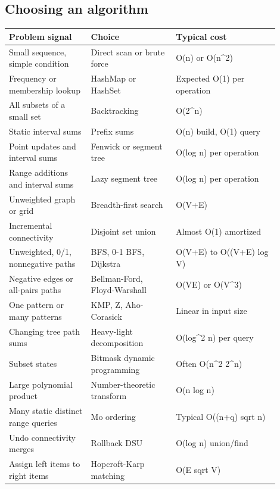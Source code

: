 \documentclass[10pt,letterpaper]{article}
\begin{document}
\subsection*{Choosing an algorithm}
\small\begin{longtable}{>{\raggedright\arraybackslash}p{0.27\linewidth}>{\raggedright\arraybackslash}p{0.29\linewidth}>{\raggedright\arraybackslash}p{0.34\linewidth}}\toprule
\textbf{Problem signal} & \textbf{Choice} & \textbf{Typical cost}\\\midrule\endhead
Small sequence, simple condition & Direct scan or brute force & O(n) or O(n\textasciicircum{}2)\\
Frequency or membership lookup & HashMap or HashSet & Expected O(1) per operation\\
All subsets of a small set & Backtracking & O(2\textasciicircum{}n)\\
Static interval sums & Prefix sums & O(n) build, O(1) query\\
Point updates and interval sums & Fenwick or segment tree & O(log n) per operation\\
Range additions and interval sums & Lazy segment tree & O(log n) per operation\\
Unweighted graph or grid & Breadth-first search & O(V+E)\\
Incremental connectivity & Disjoint set union & Almost O(1) amortized\\
Unweighted, 0/1, nonnegative paths & BFS, 0-1 BFS, Dijkstra & O(V+E) to O((V+E) log V)\\
Negative edges or all-pairs paths & Bellman-Ford, Floyd-Warshall & O(VE) or O(V\textasciicircum{}3)\\
One pattern or many patterns & KMP, Z, Aho-Corasick & Linear in input size\\
Changing tree path sums & Heavy-light decomposition & O(log\textasciicircum{}2 n) per query\\
Subset states & Bitmask dynamic programming & Often O(n\textasciicircum{}2 2\textasciicircum{}n)\\
Large polynomial product & Number-theoretic transform & O(n log n)\\
Many static distinct range queries & Mo ordering & Typical O((n+q) sqrt n)\\
Undo connectivity merges & Rollback DSU & O(log n) union/find\\
Assign left items to right items & Hopcroft-Karp matching & O(E sqrt V)\\

\end{longtable}
\end{document}
